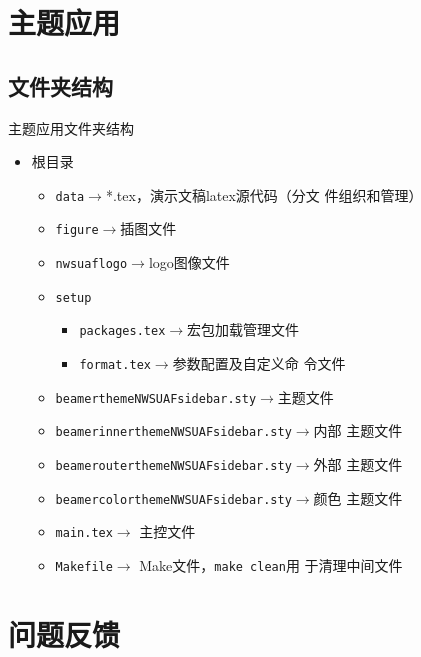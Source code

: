 \section{主题应用}
{
 \subsection{文件夹结构}
\begin{frame}{主题应用}{文件夹结构}
  \begin{itemize}
  \item 根目录
    \begin{itemize}
    \item {\tt data}$\longrightarrow$*.tex，演示文稿latex源代码（分文
      件组织和管理）
    \item {\tt figure}$\longrightarrow$插图文件
    \item {\tt nwsuaflogo}$\longrightarrow$logo图像文件
    \item {\tt setup}
      \begin{itemize}
      \item {\tt packages.tex}$\longrightarrow$宏包加载管理文件
      \item {\tt format.tex}$\longrightarrow$参数配置及自定义命
        令文件
      \end{itemize}
    \item {\tt beamerthemeNWSUAFsidebar.sty}$\longrightarrow$主题文件
    \item {\tt beamerinnerthemeNWSUAFsidebar.sty}$\longrightarrow$内部
      主题文件
    \item {\tt beamerouterthemeNWSUAFsidebar.sty}$\longrightarrow$外部
      主题文件
    \item {\tt beamercolorthemeNWSUAFsidebar.sty}$\longrightarrow$颜色
      主题文件
    \item {\tt main.tex}$\longrightarrow$ 主控文件
    \item {\tt Makefile}$\longrightarrow$ Make文件，{\tt make clean}用
      于清理中间文件
    \end{itemize}
  \end{itemize}
\end{frame}}

\section{问题反馈}
